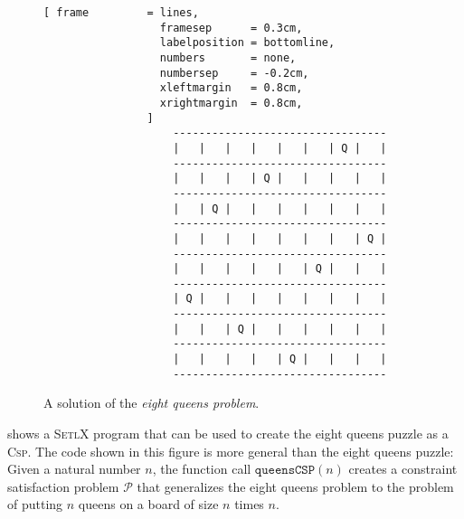 \begin{figure}[!ht]
\centering
\begin{Verbatim}[ frame         = lines, 
                  framesep      = 0.3cm, 
                  labelposition = bottomline,
                  numbers       = none,
                  numbersep     = -0.2cm,
                  xleftmargin   = 0.8cm,
                  xrightmargin  = 0.8cm,
                ]
                    ---------------------------------
                    |   |   |   |   |   |   | Q |   |
                    ---------------------------------
                    |   |   |   | Q |   |   |   |   |
                    ---------------------------------
                    |   | Q |   |   |   |   |   |   |
                    ---------------------------------
                    |   |   |   |   |   |   |   | Q |
                    ---------------------------------
                    |   |   |   |   |   | Q |   |   |
                    ---------------------------------
                    | Q |   |   |   |   |   |   |   |
                    ---------------------------------
                    |   |   | Q |   |   |   |   |   |
                    ---------------------------------
                    |   |   |   |   | Q |   |   |   |
                    ---------------------------------
\end{Verbatim}
\vspace*{-0.3cm}
\caption{A solution of the \emph{eight queens problem}.}
\label{fig:eight-queens.txt}
\end{figure}

 shows a \textsc{SetlX} program that can be used to create the eight queens puzzle as a
\textsc{Csp}.  The code shown in this figure is more general than the eight queens puzzle:  Given a natural
number $n$, the function call $\mathtt{queensCSP}(n)$ creates a constraint satisfaction problem $\mathcal{P}$ that generalizes
the eight queens problem to the problem of putting $n$ queens on a board of size $n$ times $n$.

